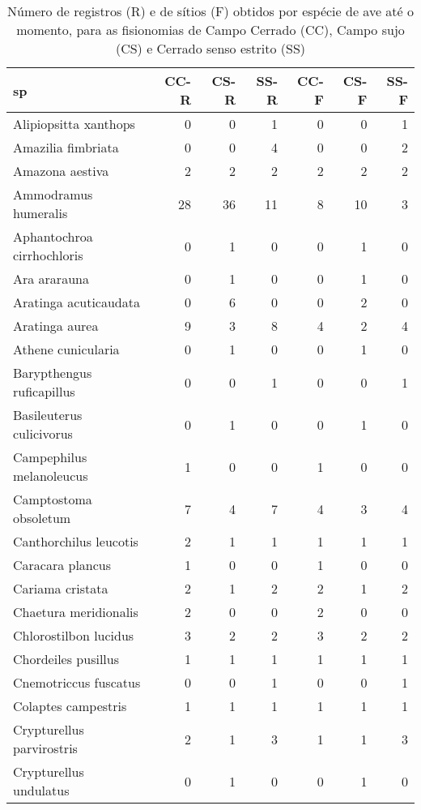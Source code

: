 \begin{table}%
  \label{tab:aves1}
  \caption{ Número de registros (R) e de sítios (F) obtidos por espécie de ave
    até o momento, para as fisionomias de Campo Cerrado (CC), Campo sujo (CS) e Cerrado senso estrito (SS)}
  \begin{tabular}{lrrrrrr}
    \hline
    sp & CC-R & CS-R & SS-R &  CC-F & CS-F & SS-F \\
    \hline
    Alipiopsitta xanthops & 0 & 0 & 1 & 0 & 0 & 1 \\ 
    Amazilia fimbriata & 0 & 0 & 4 & 0 & 0 & 2 \\ 
    Amazona aestiva & 2 & 2 & 2 & 2 & 2 & 2 \\ 
    Ammodramus humeralis & 28 & 36 & 11 & 8 & 10 & 3 \\ 
    Aphantochroa cirrhochloris & 0 & 1 & 0 & 0 & 1 & 0 \\ 
    Ara ararauna & 0 & 1 & 0 & 0 & 1 & 0 \\ 
    Aratinga acuticaudata & 0 & 6 & 0 & 0 & 2 & 0 \\ 
    Aratinga aurea & 9 & 3 & 8 & 4 & 2 & 4 \\ 
    Athene cunicularia & 0 & 1 & 0 & 0 & 1 & 0 \\ 
    Barypthengus ruficapillus & 0 & 0 & 1 & 0 & 0 & 1 \\ 
    Basileuterus culicivorus & 0 & 1 & 0 & 0 & 1 & 0 \\ 
    Campephilus melanoleucus & 1 & 0 & 0 & 1 & 0 & 0 \\ 
    Camptostoma obsoletum & 7 & 4 & 7 & 4 & 3 & 4 \\ 
    Canthorchilus leucotis & 2 & 1 & 1 & 1 & 1 & 1 \\ 
    Caracara plancus & 1 & 0 & 0 & 1 & 0 & 0 \\ 
    Cariama cristata & 2 & 1 & 2 & 2 & 1 & 2 \\ 
    Chaetura meridionalis & 2 & 0 & 0 & 2 & 0 & 0 \\ 
    Chlorostilbon lucidus & 3 & 2 & 2 & 3 & 2 & 2 \\ 
    Chordeiles pusillus & 1 & 1 & 1 & 1 & 1 & 1 \\ 
    Cnemotriccus fuscatus & 0 & 0 & 1 & 0 & 0 & 1 \\ 
    Colaptes campestris & 1 & 1 & 1 & 1 & 1 & 1 \\ 
    Crypturellus parvirostris & 2 & 1 & 3 & 1 & 1 & 3 \\ 
    Crypturellus undulatus & 0 & 1 & 0 & 0 & 1 & 0 \\ 

\end{tabular}
\end{table}
